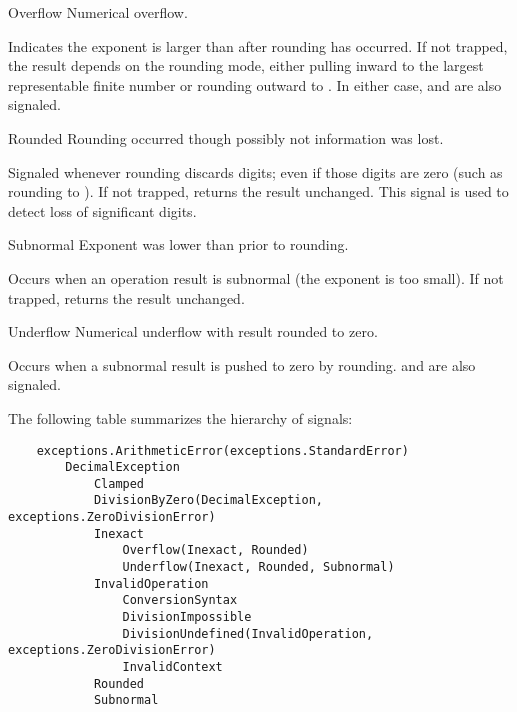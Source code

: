 \begin{classdesc*}{Overflow}
    Numerical overflow.

    Indicates the exponent is larger than  after rounding has
    occurred.  If not trapped, the result depends on the rounding mode, either
    pulling inward to the largest representable finite number or rounding
    outward to .  In either case,  and
     are also signaled.   
\end{classdesc*}


\begin{classdesc*}{Rounded}
    Rounding occurred though possibly not information was lost.

    Signaled whenever rounding discards digits; even if those digits are
    zero (such as rounding  to ).   If not
    trapped, returns the result unchanged.  This signal is used to detect
    loss of significant digits.
\end{classdesc*}

\begin{classdesc*}{Subnormal}
    Exponent was lower than  prior to rounding.
          
    Occurs when an operation result is subnormal (the exponent is too small).
    If not trapped, returns the result unchanged.
\end{classdesc*}

\begin{classdesc*}{Underflow}
    Numerical underflow with result rounded to zero.

    Occurs when a subnormal result is pushed to zero by rounding.
     and  are also signaled.
\end{classdesc*}

The following table summarizes the hierarchy of signals:

\begin{verbatim}    
    exceptions.ArithmeticError(exceptions.StandardError)
        DecimalException
            Clamped
            DivisionByZero(DecimalException, exceptions.ZeroDivisionError)
            Inexact
                Overflow(Inexact, Rounded)
                Underflow(Inexact, Rounded, Subnormal)
            InvalidOperation
                ConversionSyntax
                DivisionImpossible
                DivisionUndefined(InvalidOperation, exceptions.ZeroDivisionError)
                InvalidContext
            Rounded
            Subnormal
\end{verbatim}            



